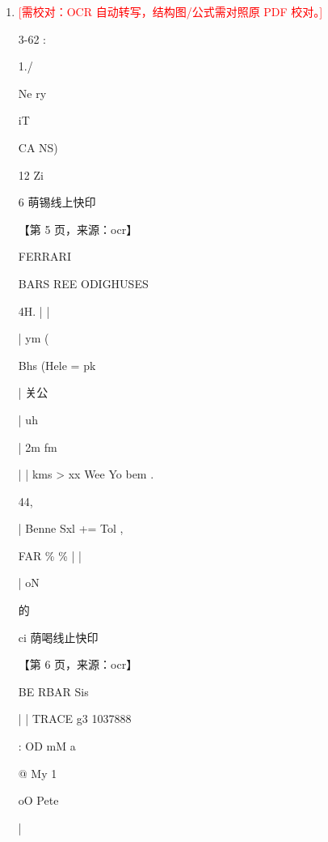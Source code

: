 \documentclass[UTF8,12pt,a4paper,openany]{ctexbook}
\newcommand{\TODO}[1]{\textcolor{red}{[需校对：#1]}}
\begin{document}
\begin{enumerate}[label=\textbf{\arabic*.},leftmargin=2em]
\item \TODO{OCR 自动转写，结构图/公式需对照原 PDF 校对。}\par 3-62                               :\par 1./\par Ne   ry\par iT\par CA NS)\par 12                                                                                    Zi\par 6                                                                             萌锡线上快印\par \par 【第 5 页，来源：ocr】\par FERRARI\par BARS         REE ODIGHUSES\par 4H.          |                                               |\par |                        ym                                        (\par Bhs (Hele = pk\par |      关公\par |      uh\par |                                   2m     fm\par |       | kms > xx Wee Yo bem                                       .\par 44,\par |                       Benne Sxl += Tol                          ,\par FAR   \%  \%                            |                   |\par |      oN\par 的\par ci                            荫喝线止快印\par \par 【第 6 页，来源：ocr】\par BE RBAR Sis\par |               |                              TRACE g3 1037888\par :      OD mM                        a\par @ My              1\par oO Pete\par |                       
\end{enumerate}
\end{document}
